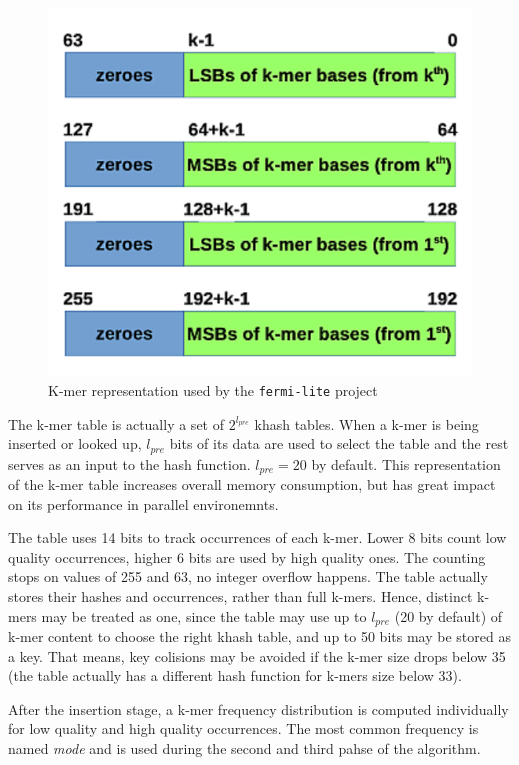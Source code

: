 \begin{figure}[h]
	\centering
	\includegraphics{img/fermi-kmer-structure.pdf}
	\caption{K-mer representation used by the \texttt{fermi-lite} project}
	\label{fig:fermi-kmer-structure}
\end{figure}

The k-mer table is actually a set of $2^{l_{pre}}$ khash tables. When a k-mer is being inserted or looked up, $l_{pre}$ bits of its data are used to select the table and the rest serves as an input to the hash function. $l_{pre} = 20$ by default. This representation of the k-mer table increases overall memory consumption, but has great impact on its performance in parallel environemnts. 

The table uses 14 bits to track occurrences of each k-mer. Lower 8 bits count low quality occurrences, higher 6 bits are used by high quality ones. The counting stops on values of 255 and 63, no integer overflow happens. The table actually stores their hashes and occurrences, rather than full k-mers. Hence, distinct k-mers may be treated as one, since the table may use up to $l_{pre}$ (20 by default) of k-mer content to choose the right khash table, and up to 50 bits may be stored as a key. That means, key colisions may be avoided if the k-mer size drops below 35 (the table actually has a different hash function for k-mers size below 33).

After the insertion stage, a k-mer frequency distribution is computed individually for low quality and high quality occurrences. The most common frequency is named \textit{mode} and is used during the second and third pahse of the algorithm.

